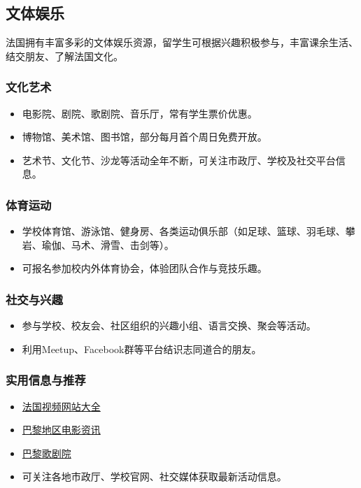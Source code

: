 \subsection{文体娱乐}
法国拥有丰富多彩的文体娱乐资源，留学生可根据兴趣积极参与，丰富课余生活、结交朋友、了解法国文化。

\subsubsection{文化艺术}
\begin{itemize}
    \item 电影院、剧院、歌剧院、音乐厅，常有学生票价优惠。
    \item 博物馆、美术馆、图书馆，部分每月首个周日免费开放。
    \item 艺术节、文化节、沙龙等活动全年不断，可关注市政厅、学校及社交平台信息。
\end{itemize}

\subsubsection{体育运动}
\begin{itemize}
    \item 学校体育馆、游泳馆、健身房、各类运动俱乐部（如足球、篮球、羽毛球、攀岩、瑜伽、马术、滑雪、击剑等）。
    \item 可报名参加校内外体育协会，体验团队合作与竞技乐趣。
\end{itemize}

\subsubsection{社交与兴趣}
\begin{itemize}
    \item 参与学校、校友会、社区组织的兴趣小组、语言交换、聚会等活动。
    \item 利用Meetup、Facebook群等平台结识志同道合的朋友。
\end{itemize}

\subsubsection{实用信息与推荐}
\begin{itemize}
    \item \href{https://www.ecentime.com/article/streaming-website}{法国视频网站大全}
    \item \href{https://paris-cine.info/}{巴黎地区电影资讯}
    \item \href{https://www.operadeparis.fr/en}{巴黎歌剧院}
    \item 可关注各地市政厅、学校官网、社交媒体获取最新活动信息。
\end{itemize}

